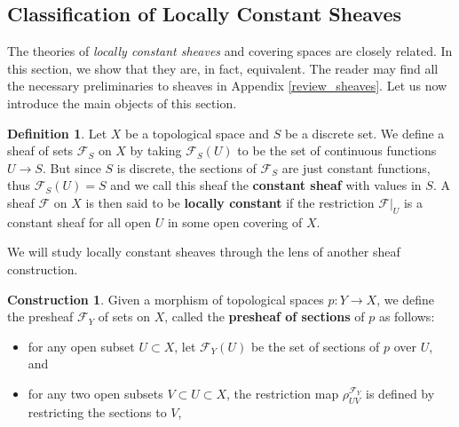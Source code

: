 \documentclass{article}
\theoremstyle{plain}
\theoremstyle{definition}
\newtheorem{definition}[theorem]{Definition}
\newtheorem{construction}[theorem]{Construction}
\begin{document}
\subsection{Classification of Locally Constant Sheaves}

The theories of \textit{locally constant sheaves} and covering spaces are closely related. 
In this section, we show that they are, in fact, equivalent. 
The reader may find all the necessary preliminaries to sheaves in Appendix \ref{review_sheaves}. Let us now introduce the main objects of this section.





\begin{definition}
    Let $X$ be a topological space and $S$ be a discrete set. We define a sheaf of sets $\mathcal{F}_S$ on $X$ by taking $\mathcal{F}_S(U)$ to be the set of continuous functions $U\rightarrow S$. But since $S$ is discrete, the sections of $\mathcal{F}_S$ are just constant functions, thus $\mathcal{F}_S(U) = S$ and we call this sheaf the \textbf{constant sheaf} with values in $S$.
    A sheaf $\mathcal{F}$ on $X$ is then said to be \textbf{locally constant} if the restriction $\mathcal{F}\vert_U$ is a constant sheaf for all open $U$ in some open covering of $X$.
\end{definition}

\noindent We will study locally constant sheaves through the lens of another sheaf construction. 

\begin{construction}
    Given a morphism of topological spaces $p:Y\rightarrow X$, we define the presheaf $\mathcal{F}_Y$ of sets on $X$, called the \textbf{presheaf of sections} of $p$ as follows:
\begin{itemize}
    \item[$a)$] for any open subset $U\subset X$, let $\mathcal{F}_Y(U)$ be the set of sections of $p$ over $U$, and
    \item[$b)$] for any two open subsets $V\subset U\subset X$, the restriction map $\rho_{UV}^{\mathcal{F}_Y}$ is defined by restricting the sections to $V$,
\end{itemize}
\end{construction}
\end{document}

